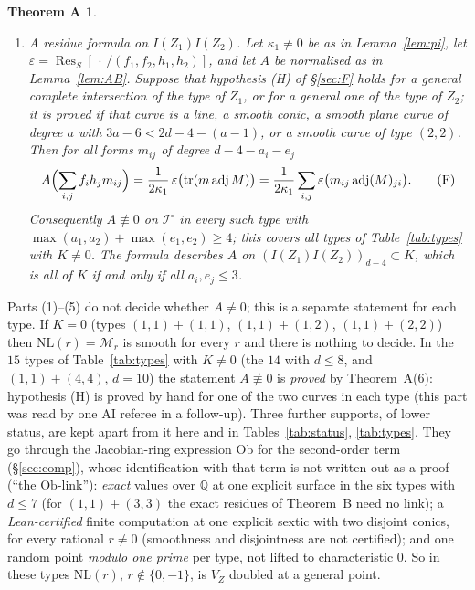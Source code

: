 \documentclass[11pt]{article}
\numberwithin{equation}{section}
\newtheorem*{thmA}{Theorem A}
\theoremstyle{remark}
\newcommand{\QQ}{\mathbb{Q}}
\newcommand{\NL}{\mathrm{NL}}
\newcommand{\VZ}{V_Z}
\newcommand{\cM}{\mathcal{M}}
\newcommand{\cI}{\mathcal{I}}
\newcommand{\Res}{\operatorname{Res}}
\newcommand{\adj}{\operatorname{adj}}
\newcommand{\Ob}{\mathrm{Ob}}
\begin{document}
\begin{thmA}
\begin{enumerate}[label=\textup{(\arabic*)}]
$\NL(r)_{\mathrm{red}}=\VZ\cup W_r$. The condition ``$A\neq0$ at $X$'' is intrinsic and is the same for all such
$r$. If $A\neq0$ at $X$, then $W_r=\emptyset$ and $\NL(r)=\{y^2=0\}$: it is $\VZ$ with a double structure, of
codimension $c_1+c_2$. If $A$ is not identically zero on the \textup{(}connected\textup{)} incidence variety
$\cI^\circ$ of triples $(Z_1,Z_2,X)$ as above, then at \emph{every} point of $\cI^\circ$ no component of $\NL(r)$
has codimension $c_1+c_2-1$, and $W_r\subsetneq\cM_r$ is a proper analytic subset.
\item \emph{A residue formula on $I(Z_1)I(Z_2)$.} Let $\kappa_1\ne0$ be as in Lemma~\ref{lem:pi}, let
$\varepsilon=\Res_S[\,\cdot\,/(f_1,f_2,h_1,h_2)]$, and let $A$ be normalised as in Lemma~\ref{lem:AB}. Suppose that
hypothesis \textup{(H)} of \S\ref{sec:F} holds for a general complete intersection of the type of $Z_1$, or for
a general one of the type of $Z_2$; it is proved if that curve is a line, a smooth conic, a smooth plane curve
of degree $a$ with $3a-6<2d-4-(a-1)$, or a smooth curve of type $(2,2)$. Then for all forms $m_{ij}$ of degree
$d-4-a_i-e_j$
\begin{equation}\label{eq:F}
A\Bigl(\sum_{i,j}f_ih_jm_{ij}\Bigr)=\frac1{2\kappa_1}\,\varepsilon\bigl(\operatorname{tr}(m\adj M)\bigr)
=\frac1{2\kappa_1}\sum_{i,j}\varepsilon\bigl(m_{ij}\adj(M)_{ji}\bigr).\tag{F}
\end{equation}
Consequently $A\not\equiv0$ on $\cI^\circ$ in every such type with $\max(a_1,a_2)+\max(e_1,e_2)\ge4$; this
covers all types of Table~\textup{\ref{tab:types}} with $K\ne0$. The formula describes $A$ on
$(I(Z_1)I(Z_2))_{d-4}\subset K$, which is all of $K$ if and only if all $a_i,e_j\le3$.
\end{enumerate}
\end{thmA}

Parts (1)--(5) do not decide whether $A\neq0$; this is a separate statement for each type. If $K=0$ (types
$(1,1)+(1,1)$, $(1,1)+(1,2)$, $(1,1)+(2,2)$) then $\NL(r)=\cM_r$ is smooth for every $r$ and there is nothing to
decide. In the $15$ types of Table~\ref{tab:types} with $K\ne0$ (the $14$ with $d\le8$, and $(1,1)+(4,4)$,
$d=10$) the statement $A\not\equiv0$ is \emph{proved} by Theorem~A(6): hypothesis (H) is proved by hand
for one of the two curves in each type (this part was read by one AI referee in a follow-up). Three further
supports, of lower status, are kept apart from it here and in Tables~\ref{tab:status}, \ref{tab:types}. They go
through the Jacobian-ring expression $\Ob$ for the second-order term (\S\ref{sec:comp}), whose identification
with that term is not written out as a proof (``the $\Ob$-link''): \emph{exact} values over $\QQ$ at one explicit
surface in the six types with $d\le7$ (for $(1,1)+(3,3)$ the exact residues of Theorem~B need no link); a
\emph{Lean-certified} finite computation at one explicit sextic with two disjoint conics, for every rational
$r\ne0$ (smoothness and disjointness are not certified); and one random point \emph{modulo one prime} per type,
not lifted to characteristic $0$. So in these types $\NL(r)$, $r\notin\{0,-1\}$, is $\VZ$ doubled at a general
point.
\end{document}
